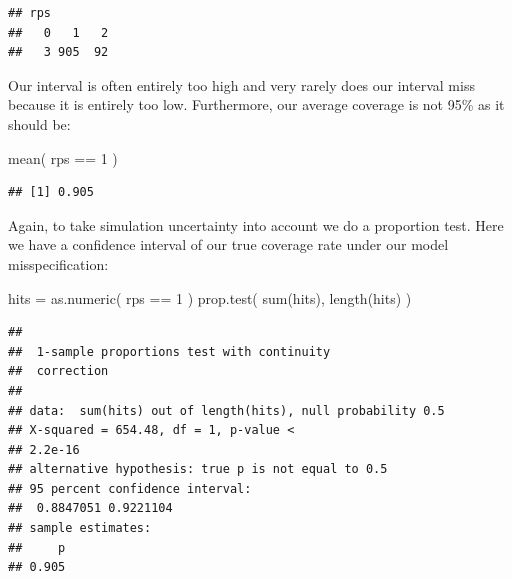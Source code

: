 \documentclass[
]{book}
\newenvironment{Shaded}{\begin{snugshade}}{\end{snugshade}}
\newcommand{\DecValTok}[1]{\textcolor[rgb]{0.00,0.00,0.81}{#1}}
\newcommand{\FunctionTok}[1]{\textcolor[rgb]{0.00,0.00,0.00}{#1}}
\newcommand{\NormalTok}[1]{#1}
\newcommand{\OtherTok}[1]{\textcolor[rgb]{0.56,0.35,0.01}{#1}}
\newcommand{\SpecialCharTok}[1]{\textcolor[rgb]{0.00,0.00,0.00}{#1}}
\begin{document}
\begin{Shaded}
\end{Shaded}

\begin{verbatim}
## rps
##   0   1   2 
##   3 905  92
\end{verbatim}

Our interval is often entirely too high and very rarely does our interval miss
because it is entirely too low.
Furthermore, our average coverage is not 95\% as it should be:

\begin{Shaded}
\begin{Highlighting}[]
\FunctionTok{mean}\NormalTok{( rps }\SpecialCharTok{==} \DecValTok{1}\NormalTok{ )}
\end{Highlighting}
\end{Shaded}

\begin{verbatim}
## [1] 0.905
\end{verbatim}

Again, to take simulation uncertainty into account we do a proportion test.
Here we have a confidence interval of our true coverage rate under our model
misspecification:

\begin{Shaded}
\begin{Highlighting}[]
\NormalTok{hits }\OtherTok{=} \FunctionTok{as.numeric}\NormalTok{( rps }\SpecialCharTok{==} \DecValTok{1}\NormalTok{ )}
\FunctionTok{prop.test}\NormalTok{( }\FunctionTok{sum}\NormalTok{(hits), }\FunctionTok{length}\NormalTok{(hits) )}
\end{Highlighting}
\end{Shaded}

\begin{verbatim}
## 
##  1-sample proportions test with continuity
##  correction
## 
## data:  sum(hits) out of length(hits), null probability 0.5
## X-squared = 654.48, df = 1, p-value <
## 2.2e-16
## alternative hypothesis: true p is not equal to 0.5
## 95 percent confidence interval:
##  0.8847051 0.9221104
## sample estimates:
##     p 
## 0.905
\end{verbatim}
\end{document}
